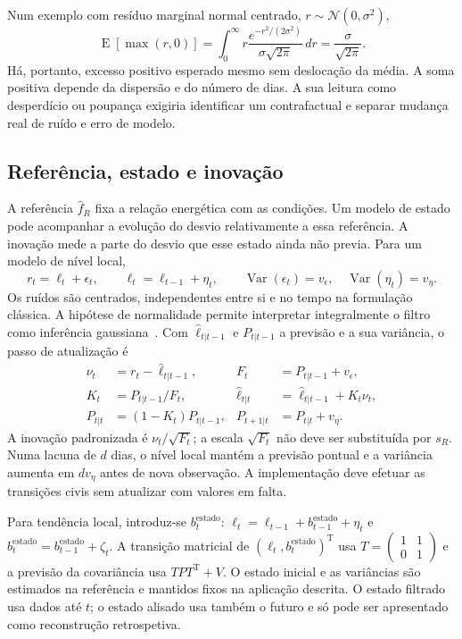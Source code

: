 Num exemplo com resíduo marginal normal centrado, $r\sim\mathcal N(0,\sigma^2)$,
\begin{equation}
\operatorname{E}[\max(r,0)]=\int_0^\infty r\frac{e^{-r^2/(2\sigma^2)}}{\sigma\sqrt{2\pi}}\,dr
=\frac{\sigma}{\sqrt{2\pi}}.
\label{eq:mat-excesso-ruido}
\end{equation}
Há, portanto, excesso positivo esperado mesmo sem deslocação da média. A soma positiva depende da dispersão e do número de dias. A sua leitura como desperdício ou poupança exigiria identificar um contrafactual e separar mudança real de ruído e erro de modelo.

\subsection{Referência, estado e inovação}
\label{sec:mat-tres-canais}
A referência $\widehat f_R$ fixa a relação energética com as condições. Um modelo de estado pode acompanhar a evolução do desvio relativamente a essa referência. A inovação mede a parte do desvio que esse estado ainda não previa. Para um modelo de nível local,
\begin{equation}
r_t=\ell_t+\epsilon_t,
\qquad \ell_t=\ell_{t-1}+\eta_t,
\qquad \operatorname{Var}(\epsilon_t)=v_\epsilon,\quad\operatorname{Var}(\eta_t)=v_\eta.
\label{eq:mat-nivel-local}
\end{equation}
Os ruídos são centrados, independentes entre si e no tempo na formulação clássica. A hipótese de normalidade permite interpretar integralmente o filtro como inferência gaussiana~\parencite{DurbinKoopman2012}. Com $\widehat\ell_{t|t-1}$ e $P_{t|t-1}$ a previsão e a sua variância, o passo de atualização é
\begin{align}
\nu_t&=r_t-\widehat\ell_{t|t-1}, &F_t&=P_{t|t-1}+v_\epsilon,\label{eq:mat-inovacao}\\
K_t&=P_{t|t-1}/F_t, &\widehat\ell_{t|t}&=\widehat\ell_{t|t-1}+K_t\nu_t,\label{eq:mat-kalman}\\
P_{t|t}&=(1-K_t)P_{t|t-1}, &P_{t+1|t}&=P_{t|t}+v_\eta.\label{eq:mat-kalman-variancia}
\end{align}
A inovação padronizada é $\nu_t/\sqrt{F_t}$; a escala $\sqrt{F_t}$ não deve ser substituída por $s_R$. Numa lacuna de $d$ dias, o nível local mantém a previsão pontual e a variância aumenta em $d v_\eta$ antes de nova observação. A implementação deve efetuar as transições civis sem atualizar com valores em falta.

Para tendência local, introduz-se $b_t^{\mathrm{estado}}$: $\ell_t=\ell_{t-1}+b_{t-1}^{\mathrm{estado}}+\eta_t$ e $b_t^{\mathrm{estado}}=b_{t-1}^{\mathrm{estado}}+\zeta_t$. A transição matricial de $(\ell_t,b_t^{\mathrm{estado}})^{\mathrm T}$ usa $T=\left(\begin{smallmatrix}1&1\\0&1\end{smallmatrix}\right)$ e a previsão da covariância usa $TP T^{\mathrm T}+V$. O estado inicial e as variâncias são estimados na referência e mantidos fixos na aplicação descrita. O estado filtrado usa dados até $t$; o estado alisado usa também o futuro e só pode ser apresentado como reconstrução retrospetiva.

